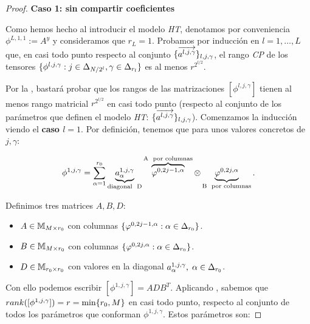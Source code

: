 \begin{proof}
    \textbf{Caso 1: sin compartir coeficientes}

    Como hemos hecho al introducir el modelo \textit{HT}, denotamos por conveniencia $\phi^{L, 1, 1}:= A^y$ y consideramos que $r_L = 1$. Probamos por inducción en $l = 1, \ldots, L$ que, en casi todo punto respecto al conjunto $\{ \overrightarrow{a^{l, j, \gamma}} \}_{l, j, \gamma}$, el rango \textit{CP} de los tensores $\{ \phi^{l, j, \gamma}: j \in \Delta_{N/2^l}, \gamma \in \Delta_{r_l} \}$ es al menos $r^{2^{l/2}}$.

    Por la , bastará probar que los rangos de las matrizaciones $[\phi^{l, j, \gamma}]$ tienen al menos rango matricial $r^{2^{l/2}}$ en casi todo punto (respecto al conjunto de los parámetros que definen el modelo \textit{HT}: $\{  \overrightarrow{a^{l, j, \gamma}} \}_{l, j, \gamma}$). Comenzamos la inducción viendo el \textbf{caso $l = 1$}. Por definición, tenemos que para unos valores concretos de $j, \gamma$:

    \begin{equation}
        \phi^{1, j, \gamma} = \sum_{\alpha = 1}^{r_0} \underbrace{a_{\alpha}^{1, j, \gamma}}_\textrm{\text{diagonal } D} \overbrace{\varphi^{0, 2j - 1, \alpha}}^\textrm{A \text{ por columnas}} \otimes \underbrace{\varphi^{0, 2j, \alpha}}_\textrm{B \text{ por columnas}}.
    \end{equation}

    Definimos tres matrices $A, B, D$:

    \begin{itemize}
        \item $A \in \mathbb{M}_{M \times r_0}$ con columnas $\{ \varphi^{0, 2j - 1, \alpha}: \alpha \in \Delta_{r_0} \}$.
        \item $B \in \mathbb{M}_{M \times r_0}$ con columnas $\{ \varphi^{0, 2j, \alpha}: \alpha \in \Delta_{r_0} \}$.
        \item $D \in \mathbb{M}_{r_0 \times r_0}$ con valores en la diagonal $a_{\alpha}^{1, j, \gamma}, \; \alpha \in \Delta_{r_0}$.
    \end{itemize}

    Con ello podemos escribir $[\phi^{1, j, \gamma}] = A D B^T$. Aplicando , sabemos que $rank([\phi^{1, j, \gamma}]) = r = \min \{ r_0, M \}$ en casi todo punto, respecto al conjunto de todos los parámetros que conforman $\phi^{1, j, \gamma}$. Estos parámetros son:


\end{proof}
